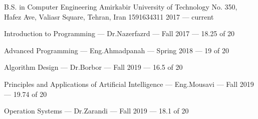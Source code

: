 

\begin{cventries}

  \cventry
    {B.S. in Computer Engineering} %
    {Amirkabir University of Technology} %
    {No. 350, Hafez Ave, Valiasr Square, Tehran, Iran 1591634311} %
    {2017 --- current} %
    {
        \begin{cvitems}
            \item Introduction to Programming --- Dr.Nazerfazrd --- Fall 2017 --- 18.25 of 20
            \item Advanced Programming --- Eng.Ahmadpanah --- Spring 2018 --- 19 of 20
            \item Algorithm Design --- Dr.Borbor --- Fall 2019 --- 16.5 of 20
            \item Principles and Applications of Artificial Intelligence --- Eng.Mousavi --- Fall 2019 --- 19.74 of 20
            \item Operation Systems --- Dr.Zarandi --- Fall 2019 --- 18.1 of 20
        \end{cvitems}
    }

\end{cventries}
